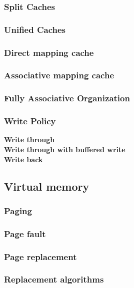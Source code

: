 \documentclass[titlepage, a4paper]{article}
\begin{document}
\subsubsection{Split Caches}

\subsubsection{Unified Caches}

\subsubsection{Direct mapping cache}

\subsubsection{Associative mapping cache}

\subsubsection{Fully Associative Organization}

\subsubsection{Write Policy}
\textbf{Write through} \\
\textbf{Write through with buffered write} \\
\textbf{Write back} \\

\subsection{Virtual memory}
\subsubsection{Paging}
\subsubsection{Page fault}
\subsubsection{Page replacement}
\subsubsection{Replacement algorithms}
\end{document}
